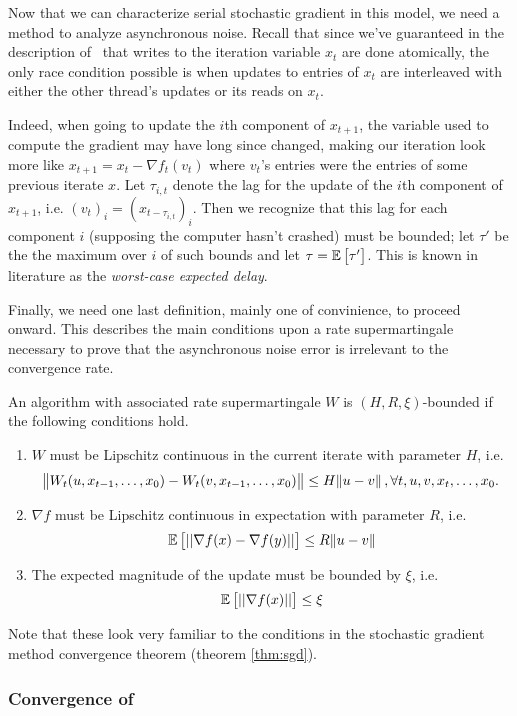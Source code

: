 Now that we can characterize serial stochastic gradient in this model, we need
a method to analyze asynchronous noise. Recall that since we've guaranteed in
the description of \hogwild\ that writes to the iteration variable $x_t$ are
done atomically, the only race condition possible is when updates to entries of
$x_t$ are interleaved with either the other thread's updates or its reads on
$x_t$.

Indeed, when going to update the $i$th component of $x_{t+1}$, the variable used
to compute the gradient may have long since changed, making our iteration look
more like $x_{t+1} = x_t - \nabla f_t(v_t)$ where $v_t$'s entries were the
entries of some previous iterate $x$. Let $\tau_{i,t}$ denote the lag for the
update of the $i$th component of $x_{t+1}$, i.e. $(v_t)_i = ( x_{t-\tau_{i,t}}
)_i$. Then we recognize that this lag for each component $i$ (supposing the
computer hasn't crashed) must be bounded; let $\tau'$ be the the maximum over
$i$ of such bounds and let $\tau = \mathbb{E}\left[\tau'\right]$. This is known in literature as
the {\it worst-case expected delay}.

Finally, we need one last definition, mainly one of convinience, to proceed
onward. This describes the main conditions upon a rate supermartingale necessary
to prove that the asynchronous noise error is irrelevant to the convergence
rate.
\begin{definition}
  An algorithm with associated rate supermartingale $W$ is $(H, R, \xi)$-bounded
  if the following conditions hold.
  \begin{enumerate}[(1)]
    \item $W$ must be Lipschitz continuous in the current iterate with parameter
      $H$, i.e.
      \[
        \norm{W_t(u, x_{t-1}, \dots, x_0) - W_t(v, x_{t-1}, \dots, x_0)}
        \leq
        H\norm{u-v}, \forall t, u, v, x_t, \dots, x_0.
      \]
    \item $\nabla f$ must be Lipschitz continuous in expectation with parameter
      $R$, i.e.
      \[
        \mathbb{E}\left[||\nabla f(x) - \nabla f(y)||\right] \leq R\norm{u-v}
      \]
    \item The expected magnitude of the update must be bounded by $\xi$, i.e.
      \[
        \mathbb{E}\left[||\nabla f(x)||\right] \leq \xi
      \]
  \end{enumerate}
  Note that these look very familiar to the conditions in the stochastic
  gradient method convergence theorem (theorem \ref{thm:sgd}).
\end{definition}

\subsubsection{Convergence of \hogwild}

